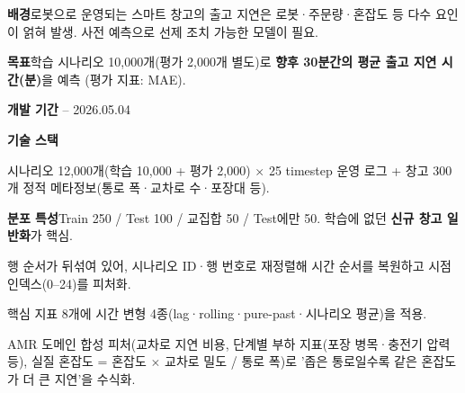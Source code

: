 

\begin{cvitems}
  \item {\textbf{배경}\enskip 로봇으로 운영되는 스마트 창고의 출고 지연은 로봇·주문량·혼잡도 등 다수 요인이 얽혀 발생. 사전 예측으로 선제 조치 가능한 모델이 필요.}
  \item {\textbf{목표}\enskip 학습 시나리오 10,000개(평가 2,000개 별도)로 \textbf{향후 30분간의 평균 출고 지연 시간(분)}을 예측 (평가 지표: MAE).}
  \item {\textbf{개발 기간} -- 2026.05.04}
  \item {\textbf{기술 스택}\enskip {}         }
\end{cvitems}

\begin{cvitems}
  \item {시나리오 12,000개(학습 10,000 + 평가 2,000) $\times$ 25 timestep 운영 로그 + 창고 300개 정적 메타정보(통로 폭·교차로 수·포장대 등).}
  \item {\textbf{분포 특성}\enskip Train 250 / Test 100 / 교집합 50 / Test에만 50. 학습에 없던 \textbf{신규 창고 일반화}가 핵심.}
\end{cvitems}


\begin{substeps}
  \item 행 순서가 뒤섞여 있어, 시나리오 ID·행 번호로 재정렬해 시간 순서를 복원하고 시점 인덱스(0--24)를 피처화.
  \item 핵심 지표 8개에 시간 변형 4종(lag·rolling·pure-past·시나리오 평균)을 적용.
  \item AMR 도메인 합성 피처(교차로 지연 비용, 단계별 부하 지표(포장 병목·충전기 압력 등), 실질 혼잡도 = 혼잡도 $\times$ 교차로 밀도 / 통로 폭)로 '좁은 통로일수록 같은 혼잡도가 더 큰 지연'을 수식화.
\end{substeps}

